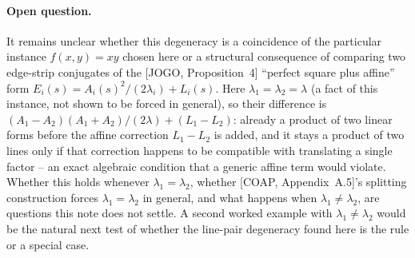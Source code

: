 \documentclass[11pt]{article}
\begin{document}
\paragraph{Open question.} It remains unclear whether this degeneracy is a
coincidence of the particular instance $f(x,y)=xy$ chosen here or a
structural consequence of comparing two edge-strip conjugates of the [JOGO,
Proposition~4] ``perfect square plus affine'' form
$E_i(s)=A_i(s)^2/(2\lambda_i)+L_i(s)$. Here $\lambda_1=\lambda_2=\lambda$ (a
fact of this instance, not shown to be forced in general), so their
difference is
$(A_1-A_2)(A_1+A_2)/(2\lambda) + (L_1-L_2)$: already a product of two linear
forms before the affine correction $L_1-L_2$ is added, and it stays a product
of two lines only if that correction happens to be compatible with
translating a single factor -- an exact algebraic condition that a generic
affine term would violate. Whether this holds whenever
$\lambda_1=\lambda_2$, whether [COAP, Appendix~A.5]'s splitting construction
forces $\lambda_1=\lambda_2$ in general, and what happens when
$\lambda_1\neq\lambda_2$, are questions this note does not settle. A second
worked example with $\lambda_1\neq\lambda_2$ would be the natural next test
of whether the line-pair degeneracy found here is the rule or a special
case.
\end{document}
